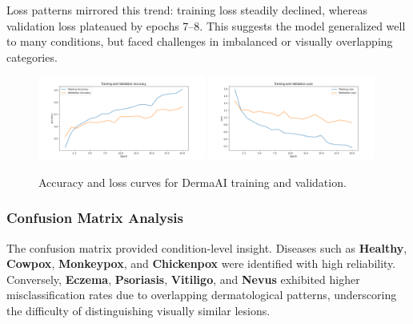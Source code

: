 \documentclass[
  12pt,
  oneside]{article}
\begin{document}
Loss patterns mirrored this trend: training loss steadily declined,
whereas validation loss plateaued by epochs 7--8. This suggests the
model generalized well to many conditions, but faced challenges in
imbalanced or visually overlapping categories.

\begin{figure}[h!]
    \centering
    \includegraphics[width=0.49\textwidth]{accuracy_curve_v3.png}
    \hfill
    \includegraphics[width=0.49\textwidth]{loss_curve_v3.png}
    \caption{Accuracy and loss curves for DermaAI training and validation.}
\end{figure}

\subsubsection{Confusion Matrix
Analysis}\label{confusion-matrix-analysis}

The confusion matrix provided condition-level insight. Diseases such as
\textbf{Healthy}, \textbf{Cowpox}, \textbf{Monkeypox}, and
\textbf{Chickenpox} were identified with high reliability. Conversely,
\textbf{Eczema}, \textbf{Psoriasis}, \textbf{Vitiligo}, and
\textbf{Nevus} exhibited higher misclassification rates due to
overlapping dermatological patterns, underscoring the difficulty of
distinguishing visually similar lesions.
\end{document}
